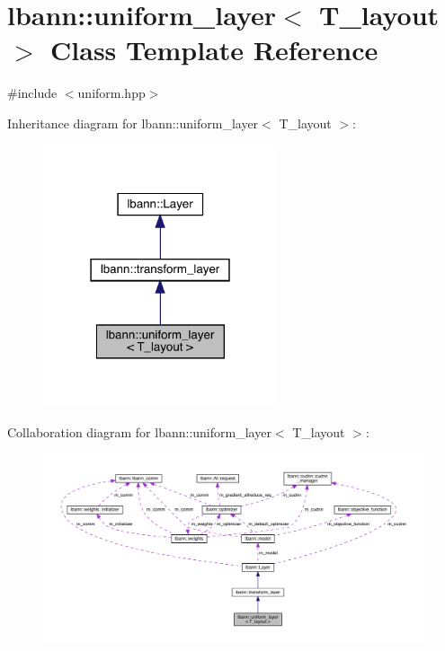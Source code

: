 \hypertarget{classlbann_1_1uniform__layer}{}\section{lbann\+:\+:uniform\+\_\+layer$<$ T\+\_\+layout $>$ Class Template Reference}
\label{classlbann_1_1uniform__layer}


{\ttfamily \#include $<$uniform.\+hpp$>$}



Inheritance diagram for lbann\+:\+:uniform\+\_\+layer$<$ T\+\_\+layout $>$\+:\nopagebreak
\begin{figure}[H]
\begin{center}
\leavevmode
\includegraphics[width=195pt]{classlbann_1_1uniform__layer__inherit__graph}
\end{center}
\end{figure}


Collaboration diagram for lbann\+:\+:uniform\+\_\+layer$<$ T\+\_\+layout $>$\+:\nopagebreak
\begin{figure}[H]
\begin{center}
\leavevmode
\includegraphics[width=350pt]{classlbann_1_1uniform__layer__coll__graph}
\end{center}
\end{figure}
